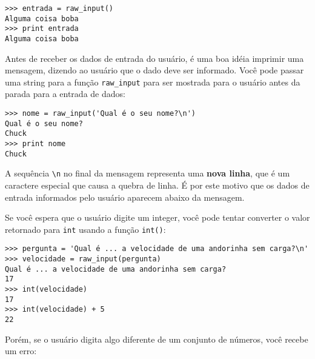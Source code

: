 
\beforeverb
\begin{verbatim}
>>> entrada = raw_input()
Alguma coisa boba
>>> print entrada
Alguma coisa boba
\end{verbatim}
\afterverb
%

Antes de receber os dados de entrada do usuário, é uma boa idéia imprimir uma 
mensagem, dizendo ao usuário que o dado deve ser informado. Você pode passar uma string 
para a função \verb"raw_input" para ser mostrada para o usuário antes da parada 
para a entrada de dados:


\beforeverb
\begin{verbatim}
>>> nome = raw_input('Qual é o seu nome?\n')
Qual é o seu nome?
Chuck
>>> print nome
Chuck
\end{verbatim}
\afterverb
%

A sequência \verb"\n" no final da mensagem representa uma {\bf nova linha},
que é um caractere especial que causa a quebra de linha. 
É por este motivo que os dados de entrada informados pelo usuário aparecem 
abaixo da mensagem.


Se você espera que o usuário digite um integer, você pode tentar converter 
o valor retornado para {\tt int} usando a função {\tt int()}: 

\beforeverb
\begin{verbatim}
>>> pergunta = 'Qual é ... a velocidade de uma andorinha sem carga?\n'
>>> velocidade = raw_input(pergunta)
Qual é ... a velocidade de uma andorinha sem carga?
17
>>> int(velocidade)
17
>>> int(velocidade) + 5
22
\end{verbatim}
\afterverb
%

Porém, se o usuário digita algo diferente de um conjunto de números, 
você recebe um erro:

